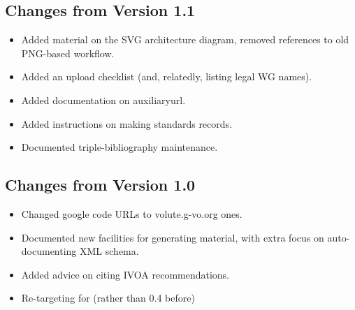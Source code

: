 \documentclass[11pt,a4paper]{ivoa}
\begin{document}
\subsection{Changes from Version 1.1}

\begin{itemize}
\item Added material on the SVG architecture diagram, removed references
to old PNG-based workflow.
\item Added an upload checklist (and, relatedly, listing legal WG names).
\item Added documentation on auxiliaryurl.
\item Added instructions on making standards records.
\item Documented triple-bibliography maintenance.
\end{itemize}

\subsection{Changes from Version 1.0}
\begin{itemize}
\item Changed google code URLs to volute.g-vo.org ones.
\item Documented new facilities for generating material, with extra
focus on auto-documenting XML schema.
\item Added advice on citing IVOA recommendations.
\item Re-targeting for  (rather than 0.4 before)
\end{itemize}



\end{document}

